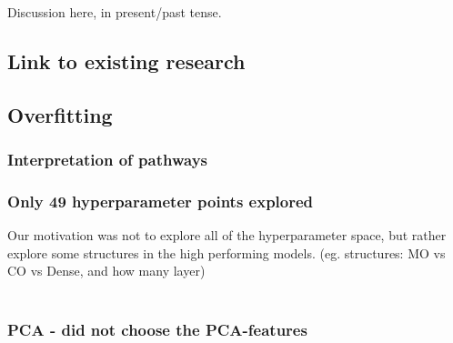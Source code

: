 Discussion here, in present/past tense.


\subsection{Link to existing research}


\subsection{Overfitting}


\subsubsection{Interpretation of pathways}

\subsubsection{Only 49 hyperparameter points explored}
    Our motivation was not to explore all of the hyperparameter space, but rather explore some structures in the high performing models. (eg. structures: MO vs CO vs Dense, and how many layer)
     \\
     \\

\subsubsection{PCA - did not choose the PCA-features}